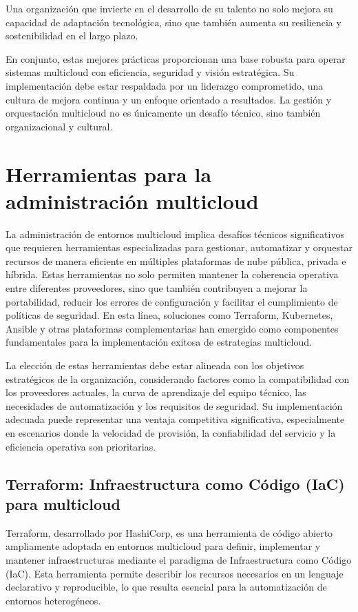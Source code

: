 {                Una organización que invierte en el desarrollo de su talento no solo mejora su capacidad de adaptación tecnológica, sino que también aumenta su resiliencia y sostenibilidad en el largo plazo.
                
                En conjunto, estas mejores prácticas proporcionan una base robusta para operar sistemas multicloud con eficiencia, seguridad y visión estratégica. Su implementación debe estar respaldada por un liderazgo comprometido, una cultura de mejora continua y un enfoque orientado a resultados. La gestión y orquestación multicloud no es únicamente un desafío técnico, sino también organizacional y cultural.

    \section{Herramientas para la administración multicloud}
        La administración de entornos multicloud implica desafíos técnicos significativos que requieren herramientas especializadas para gestionar, automatizar y orquestar recursos de manera eficiente en múltiples plataformas de nube pública, privada e híbrida. Estas herramientas no solo permiten mantener la coherencia operativa entre diferentes proveedores, sino que también contribuyen a mejorar la portabilidad, reducir los errores de configuración y facilitar el cumplimiento de políticas de seguridad. En esta línea, soluciones como Terraform, Kubernetes, Ansible y otras plataformas complementarias han emergido como componentes fundamentales para la implementación exitosa de estrategias multicloud.
            
        La elección de estas herramientas debe estar alineada con los objetivos estratégicos de la organización, considerando factores como la compatibilidad con los proveedores actuales, la curva de aprendizaje del equipo técnico, las necesidades de automatización y los requisitos de seguridad. Su implementación adecuada puede representar una ventaja competitiva significativa, especialmente en escenarios donde la velocidad de provisión, la confiabilidad del servicio y la eficiencia operativa son prioritarias.
            
        \subsection{Terraform: Infraestructura como Código (IaC) para multicloud}
            Terraform, desarrollado por HashiCorp, es una herramienta de código abierto ampliamente adoptada en entornos multicloud para definir, implementar y mantener infraestructuras mediante el paradigma de Infraestructura como Código (IaC). Esta herramienta permite describir los recursos necesarios en un lenguaje declarativo y reproducible, lo que resulta esencial para la automatización de entornos heterogéneos.
            
}
